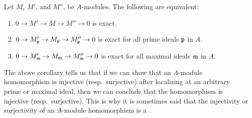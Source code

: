 \documentclass{ximera}
\begin{document}
\begin{corollary} Let $M$, $M'$, and $M''$, be $A$-modules. The following are equivalent:
\begin{enumerate}
\item $0\to M' \to M \to M'' \to 0$ is exact.
\item $0\to M'_{\mathfrak{p}} \to M_{\mathfrak{p}} \to M''_{\mathfrak{p}} \to 0$ is exact for all prime ideals $\mathfrak{p}$ in $A$.
\item $0\to M'_{\mathfrak{m}} \to M_{\mathfrak{m}} \to M''_{\mathfrak{m}} \to 0$ is exact for all maximal ideals $\mathfrak{m}$ in $A$.
\end{enumerate}
\end{corollary}



The above corollary tells us that if we can show that an $A$-module homomorphism is injective (resp.\ surjective) after localizing at an arbitrary prime or maximal ideal, then we can conclude that the homomorphism is injective (resp.\ surjective). This is why it is sometimes said that the injectivity or surjectivity of an $A$-module homomorphism is a .
\end{document}
